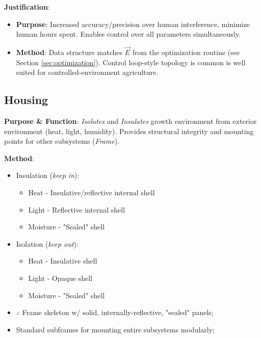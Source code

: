 \documentclass{report}
\begin{document}
\textbf{Justification}: 
\begin{itemize}
    \item \textbf{Purpose}: Increased accuracy/precision over human interference, minimize human hours spent. Enables control over all parameters simultaneously.
    \item \textbf{Method}: Data structure matches $\vec E$ from the optimization routine (see Section \ref{sec:optimization}). Control loop-style topology is common is well suited for controlled-environment agriculture.
\end{itemize}

\newpage

\subsection{Housing}
\label{sec:housing}

\textbf{Purpose \& Function}: \textit{Isolates} and \textit{Insulates} growth environment from exterior environment (heat, light, humidity). Provides structural integrity and mounting points for other subsystems (\textit{Frame}).

\textbf{Method}:
\begin{itemize}
    \item Insulation (\textit{keep in}):
    \begin{itemize}
        \item Heat - Insulative/reflective internal shell
        \item Light - Reflective internal shell
        \item Moisture - "Sealed" shell
    \end{itemize}
    \item Isolation (\textit{keep out}):
    \begin{itemize}
        \item Heat - Insulative shell
        \item Light - Opaque shell
        \item Moisture - "Sealed" shell
    \end{itemize}
    \item $\therefore$ Frame skeleton w/ solid, internally-reflective, "sealed" panels;
    \item Standard subframes for mounting entire subsystems modularly;
\end{itemize}
\end{document}
